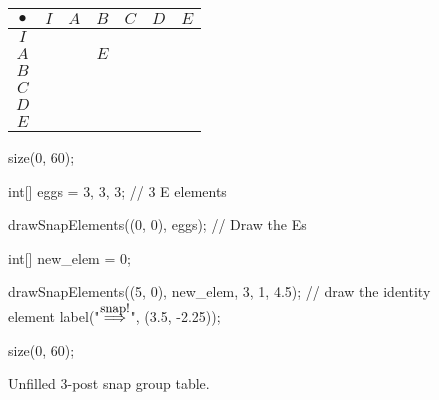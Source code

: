 \documentclass[../gatm_answers.tex]{subfiles}
\begin{document}
\newcommand\snap{\bullet}

\begin{figure}[h]
	\begin{center}
		\begin{minipage}[b]{\textwidth}
			\centering
			\begin{tabular}{c|cccccc}
				\hline
				$\snap$ & $I$ & $A$ & $B$ & $C$ & $D$ & $E$ \\ \hline
				\rowcolor{light-gray}
				$I$    &   &   &   &   &   &   \\ 
				$A$    &   &   & $E$ &   &   &   \\ 
				\rowcolor{light-gray}
				$B$    &   &   &   &   &   &   \\ 
				$C$    &   &   &   &   &   &   \\ 
				\rowcolor{light-gray}
				$D$    &   &   &   &   &   &   \\ 
				$E$    &   &   &   &   &   &   \\ \hline
			\end{tabular}
			\vspace*{0.5\baselineskip}
		\end{minipage}
	\end{center}
	\vspace*{-2\baselineskip}
	\begin{center}
		\begin{minipage}[t]{\textwidth}
			\caption{Unfilled $3$-post snap group table.}
			\label{fig:sbstable_CHANG}
		\end{minipage}
	\end{center}

	\begin{center}
		\begin{minipage}[b]{.45\textwidth}
			\centering
			\begin{asy}
				size(0, 60);

				int[] eggs = {3, 3, 3}; // 3 E elements

				drawSnapElements((0, 0), eggs); // Draw the Es

				int[] new_elem = {0};

				drawSnapElements((5, 0), new_elem, 3, 1, 4.5); // draw the identity element
				label("$\stackrel{\mbox{\small snap!}}{\Longrightarrow}$", (3.5, -2.25));
			\end{asy}
		\end{minipage}
		\hfill
		\begin{minipage}[b]{.45\textwidth}
			\centering
			\begin{asy}
				size(0, 60);


\end{asy}
\end{minipage}
\end{center}
\end{figure}
\end{document}
